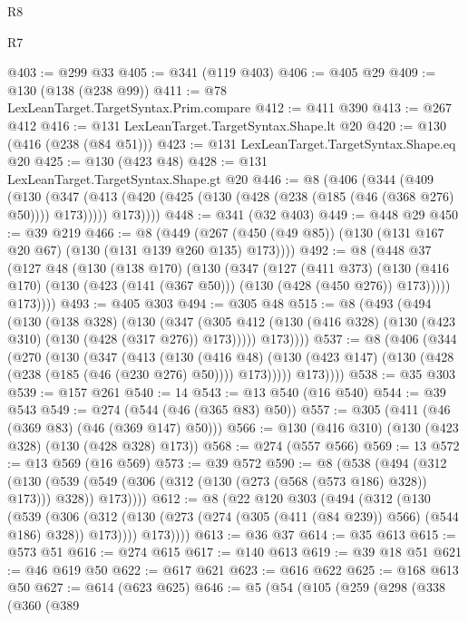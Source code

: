 \begin{lexlean}{R8}
\begin{lexlean}{R7}
\begin{coremodule}
{{{{{{{{{{{{{{{{{{{{@403 := @299 @33
@405 := @341 (@119 @403)
@406 := @405 @29
@409 := @130 (@138 (@238 @99))
@411 := @78 LexLeanTarget.TargetSyntax.Prim.compare
@412 := @411 @390
@413 := @267 @412
@416 := @131 LexLeanTarget.TargetSyntax.Shape.lt @20
@420 := @130 (@416 (@238 (@84 @51)))
@423 := @131 LexLeanTarget.TargetSyntax.Shape.eq @20
@425 := @130 (@423 @48)
@428 := @131 LexLeanTarget.TargetSyntax.Shape.gt @20
@446 := @8
    (@406
      (@344
        (@409
          (@130
            (@347 (@413 (@420 (@425 (@130 (@428 (@238 (@185 (@46 (@368 @276) @50)))) @173)))))
            @173))))
@448 := @341 (@32 @403)
@449 := @448 @29
@450 := @39 @219
@466 := @8
    (@449 (@267 (@450 (@49 @85)) (@130 (@131 @167 @20 @67) (@130 (@131 @139 @260 @135) @173))))
@492 := @8
    (@448
      @37
      (@127
        @48
        (@130
          (@138 @170)
          (@130
            (@347
              (@127
                (@411 @373)
                (@130 (@416 @170) (@130 (@423 (@141 (@367 @50))) (@130 (@428 (@450 @276)) @173)))))
            @173))))
@493 := @405 @303
@494 := @305 @48
@515 := @8
    (@493
      (@494
        (@130
          (@138 @328)
          (@130
            (@347 (@305 @412 (@130 (@416 @328) (@130 (@423 @310) (@130 (@428 (@317 @276)) @173)))))
            @173))))
@537 := @8
    (@406
      (@344
        (@270
          (@130
            (@347
              (@413
                (@130
                  (@416 @48)
                  (@130 (@423 @147) (@130 (@428 (@238 (@185 (@46 (@230 @276) @50)))) @173)))))
            @173))))
@538 := @35 @303
@539 := @157 @261
@540 := 14
@543 := @13 @540 (@16 @540)
@544 := @39 @543
@549 := @274 (@544 (@46 (@365 @83) @50))
@557 := @305 (@411 (@46 (@369 @83) (@46 (@369 @147) @50)))
@566 := @130 (@416 @310) (@130 (@423 @328) (@130 (@428 @328) @173))
@568 := @274 (@557 @566)
@569 := 13
@572 := @13 @569 (@16 @569)
@573 := @39 @572
@590 := @8
    (@538
      (@494
        (@312
          (@130 (@539 (@549 (@306 (@312 (@130 (@273 (@568 (@573 @186) @328)) @173))) @328)) @173))))
@612 := @8
    (@22
      @120
      @303
      (@494
        (@312
          (@130
            (@539
              (@306
                (@312 (@130 (@273 (@274 (@305 (@411 (@84 @239)) @566) (@544 @186) @328)) @173))))
            @173))))
@613 := @36 @37
@614 := @35 @613
@615 := @573 @51
@616 := @274 @615
@617 := @140 @613
@619 := @39 @18 @51
@621 := @46 @619 @50
@622 := @617 @621
@623 := @616 @622
@625 := @168 @613 @50
@627 := @614 (@623 @625)
@646 := @5
    (@54
      (@105
        (@259
          (@298
            (@338
              (@360
                (@389
}}}}}}}}}}}}}}}}}}}}
\end{coremodule}
\end{lexlean}
\end{lexlean}
